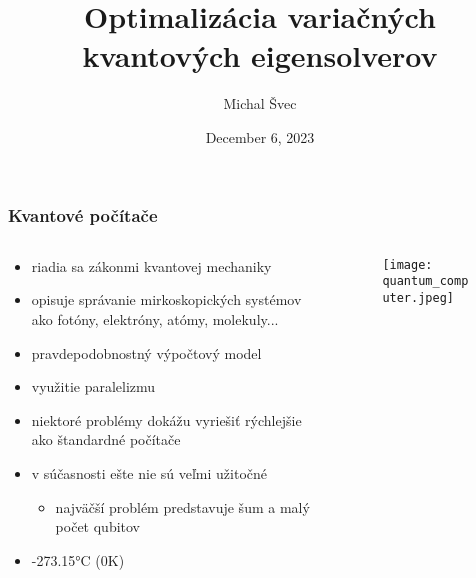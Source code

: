 \documentclass{beamer}
\title{Optimalizácia variačných kvantových eigensolverov}
\author{Michal Švec}
\institute{doc. RNDr. Martin Plesch, PhD.}
\date{December 6, 2023}
\begin{document}
\begin{frame}
	\titlepage
\end{frame}

\begin{frame}
	\frametitle{Kvantové počítače}
			
	\begin{columns}[t]
		\begin{column}{.6\textwidth}
			\centering				      
			\begin{itemize}
				\item riadia sa zákonmi kvantovej mechaniky
				\item \begin{itemize} opisuje správanie mirkoskopických systémov ako fotóny, elektróny, atómy, molekuly...\end{itemize}
				\item pravdepodobnostný výpočtový model
				\item využitie paralelizmu
				\item niektoré problémy dokážu vyriešiť rýchlejšie ako štandardné počítače
				\item v súčasnosti ešte nie sú veľmi užitočné \begin{itemize}
				\item najväčší problém predstavuje šum a malý počet qubitov
			\end{itemize}
			\item -273.15°C (0K)
			\end{itemize}
		\end{column}
						      
		\begin{column}{.4\textwidth}
			\centering
									          
			\begin{figure}
				\centering
				\texttt{[image: quantum\_computer.jpeg]}            
			\end{figure}
		\end{column}
	\end{columns}
			
			
			
\end{frame}
\end{document}
